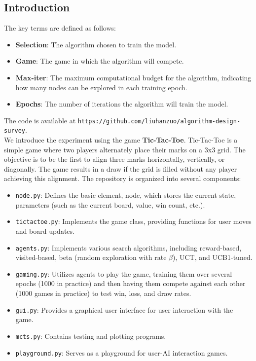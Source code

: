 \documentclass[11pt]{article}
\theoremstyle{definitionstyle}
\begin{document}
\subsection{Introduction}
The key terms are defined as follows:
\begin{itemize}
    \item \textbf{Selection}: The algorithm chosen to train the model.
    \item \textbf{Game}: The game in which the algorithm will compete.
    \item \textbf{Max-iter}: The maximum computational budget for the algorithm, indicating how many nodes can be explored in each training epoch.
    \item \textbf{Epochs}: The number of iterations the algorithm will train the model.
\end{itemize}
The code is available at \texttt{https://github.com/liuhanzuo/algorithm-design-survey}.\\
We introduce the experiment using the game \textbf{Tic-Tac-Toe}. Tic-Tac-Toe is a simple game where two players alternately place their marks on a 3x3 grid. The objective is to be the first to align three marks horizontally, vertically, or diagonally. The game results in a draw if the grid is filled without any player achieving this alignment.
The repository is organized into several components:
\begin{itemize}
    \item \texttt{node.py}: Defines the basic element, node, which stores the current state, parameters (such as the current board, value, win count, etc.).
    \item \texttt{tictactoe.py}: Implements the game class, providing functions for user moves and board updates.
    \item \texttt{agents.py}: Implements various search algorithms, including reward-based, visited-based, beta (random exploration with rate $\beta$), UCT, and UCB1-tuned.
    \item \texttt{gaming.py}: Utilizes agents to play the game, training them over several epochs (1000 in practice) and then having them compete against each other (1000 games in practice) to test win, loss, and draw rates.
    \item \texttt{gui.py}: Provides a graphical user interface for user interaction with the game.
    \item \texttt{mcts.py}: Contains testing and plotting programs.
    \item \texttt{playground.py}: Serves as a playground for user-AI interaction games.
\end{itemize}
\end{document}
